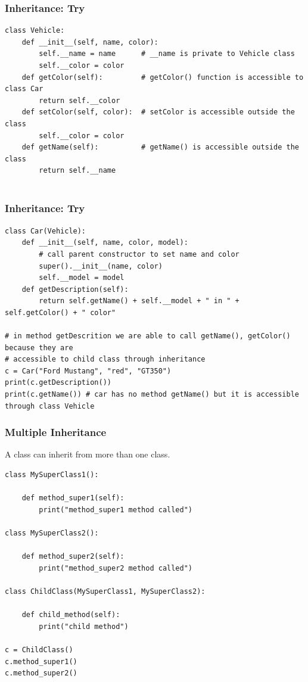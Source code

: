 \begin{frame}[fragile]\frametitle{Inheritance: Try}

\begin{lstlisting}
class Vehicle:
    def __init__(self, name, color):
        self.__name = name      # __name is private to Vehicle class
        self.__color = color
    def getColor(self):         # getColor() function is accessible to class Car
        return self.__color
    def setColor(self, color):  # setColor is accessible outside the class
        self.__color = color
    def getName(self):          # getName() is accessible outside the class
        return self.__name
 
\end{lstlisting}
\end{frame}

\begin{frame}[fragile]\frametitle{Inheritance: Try}

\begin{lstlisting}
class Car(Vehicle):
    def __init__(self, name, color, model):
        # call parent constructor to set name and color  
        super().__init__(name, color)       
        self.__model = model
    def getDescription(self):
        return self.getName() + self.__model + " in " + self.getColor() + " color"
 
# in method getDescrition we are able to call getName(), getColor() because they are 
# accessible to child class through inheritance
c = Car("Ford Mustang", "red", "GT350")
print(c.getDescription())
print(c.getName()) # car has no method getName() but it is accessible through class Vehicle
\end{lstlisting}
\end{frame}



\begin{frame}[fragile]\frametitle{Multiple Inheritance}

A class can inherit from more than one class. 
\begin{lstlisting}
class MySuperClass1():
 
    def method_super1(self):
        print("method_super1 method called")
 
class MySuperClass2():
 
    def method_super2(self):
        print("method_super2 method called")
 
class ChildClass(MySuperClass1, MySuperClass2):
 
    def child_method(self):
        print("child method")
 
c = ChildClass()
c.method_super1()
c.method_super2()
\end{lstlisting}
\end{frame}

